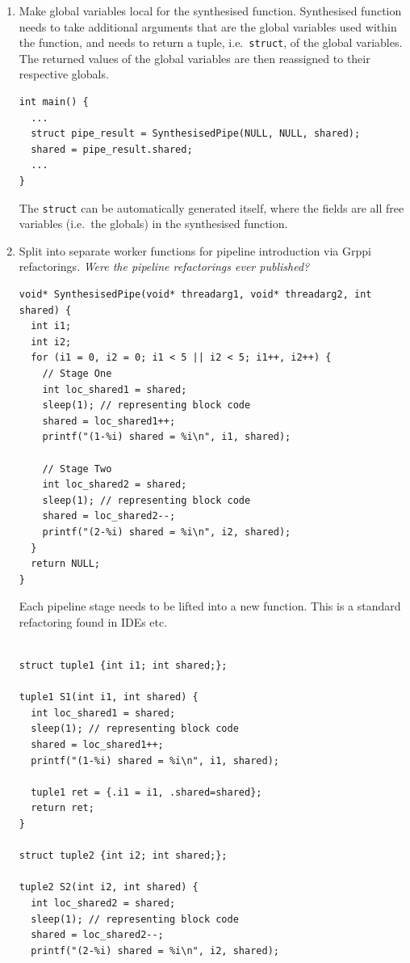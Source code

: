 \begin{enumerate}
\item Make global variables local for the synthesised function. Synthesised function needs to take additional arguments that are the global variables used within the function, and needs to return a tuple, i.e.\ \lstinline|struct|, of the global variables. The returned values of the global variables are then reassigned to their respective globals.
\begin{lstlisting}[frame=single]
int main() {
  ...
  struct pipe_result = SynthesisedPipe(NULL, NULL, shared);
  shared = pipe_result.shared;
  ...
}
\end{lstlisting}
The \lstinline|struct| can be automatically generated itself, where the fields are all free variables (i.e.\ the globals) in the synthesised function.

\item Split into separate worker functions for pipeline introduction via Grppi refactorings. \emph{Were the pipeline refactorings ever published?}
\begin{lstlisting}[frame=single]
void* SynthesisedPipe(void* threadarg1, void* threadarg2, int shared) {
  int i1;
  int i2;
  for (i1 = 0, i2 = 0; i1 < 5 || i2 < 5; i1++, i2++) {
    // Stage One
    int loc_shared1 = shared;
    sleep(1); // representing block code
    shared = loc_shared1++;
    printf("(1-%i) shared = %i\n", i1, shared);  
   
    // Stage Two
    int loc_shared2 = shared;
    sleep(1); // representing block code
    shared = loc_shared2--;
    printf("(2-%i) shared = %i\n", i2, shared);
  }
  return NULL;
}
\end{lstlisting}
Each pipeline stage needs to be lifted into a new function. This is a standard refactoring found in IDEs etc.\ 
\begin{lstlisting}[frame=single]

struct tuple1 {int i1; int shared;};

tuple1 S1(int i1, int shared) {
  int loc_shared1 = shared;
  sleep(1); // representing block code
  shared = loc_shared1++;
  printf("(1-%i) shared = %i\n", i1, shared);  
  
  tuple1 ret = {.i1 = i1, .shared=shared};
  return ret;
}

struct tuple2 {int i2; int shared;};

tuple2 S2(int i2, int shared) {
  int loc_shared2 = shared;
  sleep(1); // representing block code
  shared = loc_shared2--;
  printf("(2-%i) shared = %i\n", i2, shared);
  

\end{lstlisting}
\end{enumerate}
